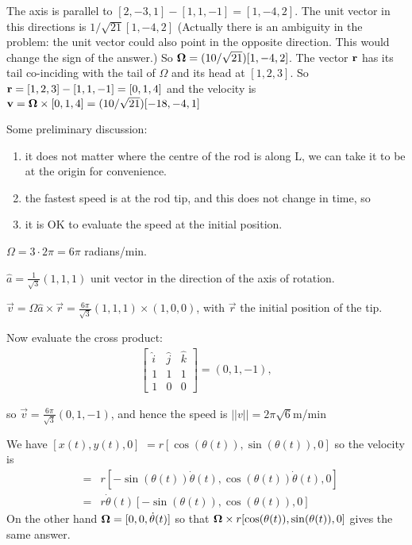 \vspace{2mm}
The axis is parallel to $[2,-3,1]-[1,1,-1]=[1,-4,2]$. The unit vector in this 
directions is $1/\sqrt{21}[1,-4,2]$ (Actually there is an ambiguity in the
problem: the unit vector could also point in the opposite direction. This would
change the sign of the answer.) So ${\bf \Omega}=(10/\sqrt{21})[1,-4,2]$. The 
vector ${\bf r}$ has its tail co-inciding with the tail of $\Omega$ and its head
at $[1,2,3]$. So ${\bf r}=[1,2,3]-[1,1,-1]=[0,1,4]$ and the
velocity is ${\bf v}={\bf \Omega}\times[0,1,4]=(10/\sqrt{21})[-18,-4,1]$

\vspace{2mm}
Some preliminary discussion:
{\begin{enumerate}
\renewcommand{\labelenumi}{(\roman{enumi})}
\item it does not matter where the centre of the rod is along L, we can take it to be at the origin for convenience.
\item the fastest speed is at the rod tip, and this does not change in time, so
\item it is OK to evaluate the speed at the initial position.
\end{enumerate}}
% 
$\Omega = 3\cdot 2\pi = 6\pi$ radians/min.

$\hat{a} = \frac{1}{\sqrt{3}}(1,1,1)$ unit vector in the direction of the axis of rotation.

$\vec{v} = \Omega\hat{a}\times\vec{r} = \frac{6\pi}{\sqrt{3}}(1,1,1)\times(1,0,0)$, with $\vec{r}$ the initial position of the tip.

Now evaluate the cross product:
\begin{eqnarray*}
 \left[ \begin{array}{ccc}
\hat{i} & \hat{j} & \hat{k} \\
1 & 1 & 1 \\
1 & 0 & 0
\end{array} \right] = (0,1,-1),
\end{eqnarray*}

so $\vec{v} = \frac{6\pi}{\sqrt{3}}(0,1,-1)$, and hence the speed is $||v|| = 2\pi\sqrt{6}$m/min

\vspace{2mm}
We have $[x(t),y(t),0]$ $=r[\cos(\theta(t)),\sin(\theta(t)),0]$ so the velocity
is 
\begin{eqnarray*}
[\dot x(t),\dot y(t),0] &= & 
r[-\sin(\theta(t))\dot\theta(t),\cos(\theta(t))\dot\theta(t),0] \\
&= & 
r\dot\theta(t)[-\sin(\theta(t)),\cos(\theta(t)),0]
\end{eqnarray*}
On the other hand ${\bf \Omega}=[0,0,\dot\theta(t)]$ so that 
${\bf \Omega}\times r[\cos(\theta(t)),\sin(\theta(t)),0]$ gives the same
answer.

